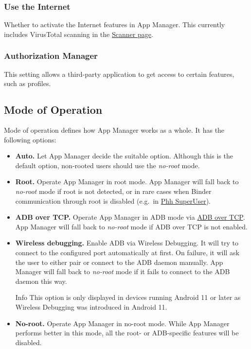 \subsubsection{Use the Internet}\label{subsubsec:use-the-internet} %
Whether to activate the Internet features in App Manager. This currently includes VirusTotal
scanning in the \hyperref[sec:scanner-page]{Scanner page}.

\subsubsection{Authorization Manager}\label{subsubsec:auth-manager} %
This setting allows a third-party application to get access to certain features, such as profiles.

\subsection{Mode of Operation}\label{subsec:mode-of-operation} %
Mode of operation defines how App Manager works as a whole. It has the following options:
\begin{itemize}
    \item \textbf{Auto.} Let App Manager decide the suitable option.
    Although this is the default option, non-rooted users should use the \textit{no-root} mode.

    \item \textbf{Root.} Operate App Manager in root mode. App Manager will fall back to \textit{no-root} mode if root
    is not detected, or in rare cases when Binder communication through root is disabled (e.g.\ in \href{https://github.com/MuntashirAkon/AppManager/issues/606}{Phh SuperUser}).

    \item \textbf{ADB over TCP.} Operate App Manager in ADB mode via \hyperref[sec:adb-over-tcp]{ADB over TCP}.
    App Manager will fall back to \textit{no-root} mode if ADB over TCP is not enabled.

    \item \textbf{Wireless debugging.} Enable ADB via Wireless Debugging. It will try to connect to the configured port
    automatically at first. On failure, it will ask the user to either pair or connect to the ADB daemon manually.
    App Manager will fall back to \textit{no-root} mode if it fails to connect to the ADB daemon this way.
    \begin{tip}{Info}
        This option is only displayed in devices running Android 11 or later as Wireless Debugging was introduced in Android 11.
    \end{tip}

    \item \textbf{No-root.} Operate App Manager in no-root mode. While App Manager performs better in this mode,
    all the root- or ADB-specific features will be disabled.
\end{itemize}

